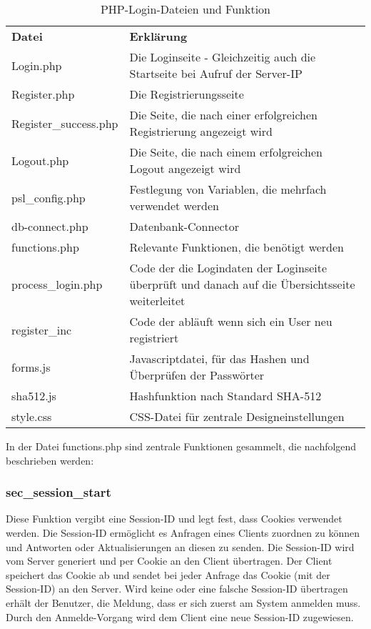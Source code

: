 \begin{table}
\caption{PHP-Login-Dateien und Funktion}
\label{tab:Login-Dateien}
\begin{tabular}{p{} p{}}
\textbf{Datei} 				& \textbf{Erklärung} \\
Login.php 						& Die Loginseite - Gleichzeitig auch die Startseite bei Aufruf der Server-IP\\
Register.php 					& Die Registrierungsseite \\
Register\_success.php & Die Seite, die nach einer erfolgreichen Registrierung angezeigt wird \\
Logout.php 						& Die Seite, die nach einem erfolgreichen Logout angezeigt wird \\
psl\_config.php 			& Festlegung von Variablen, die mehrfach verwendet werden \\
db-connect.php 				& Datenbank-Connector \\
functions.php 				& Relevante Funktionen, die benötigt werden \\
process\_login.php 		& Code der die Logindaten der Loginseite überprüft und danach auf die Übersichtsseite weiterleitet \\
register\_inc 				& Code der abläuft wenn sich ein User neu registriert \\
forms.js 							& Javascriptdatei, für das Hashen und Überprüfen der Passwörter \\
sha512.js 						& Hashfunktion nach Standard SHA-512 \\
style.css 						& CSS-Datei für zentrale Designeinstellungen \\
 \end{tabular}
\end{table}

In der Datei functions.php sind zentrale Funktionen gesammelt, die nachfolgend
beschrieben werden:

\subsubsection{sec\_session\_start}
Diese Funktion vergibt eine Session-ID und legt fest, dass Cookies verwendet werden. Die Session-ID ermöglicht es Anfragen eines Clients zuordnen zu können und Antworten oder Aktualisierungen an diesen zu senden. Die Session-ID wird vom Server generiert und per Cookie an den Client übertragen. Der Client speichert das Cookie ab und sendet bei jeder Anfrage das Cookie (mit der Session-ID) an den Server. Wird keine oder eine falsche Session-ID übertragen erhält der Benutzer, die Meldung, dass er sich zuerst am System anmelden muss. Durch den Anmelde-Vorgang wird dem Client eine neue Session-ID zugewiesen.

